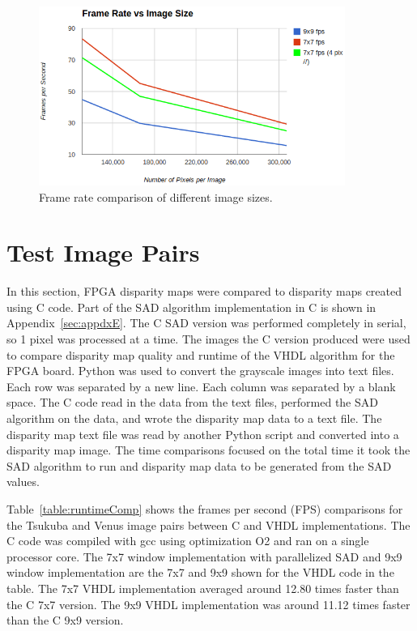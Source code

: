 \begin{figure}
	\begin{center}
		\includegraphics[width=100mm]{figures/frameRate.png}
		\captionfonts
		\caption{Frame rate comparison of different image sizes.}
		\label{fig:frameRate}
	\end{center}
\end{figure}

\section{Test Image Pairs}
\label{sec:runtime}

In this section, FPGA disparity maps were compared to disparity maps created using C code. Part of the SAD algorithm implementation in C is shown in Appendix~\ref{sec:appdxE}. The C SAD version was performed completely in serial, so 1 pixel was processed at a time. The images the C version produced were used to compare disparity map quality and runtime of the VHDL algorithm for the FPGA board. Python was used to convert the grayscale images into text files. Each row was separated by a new line. Each column was separated by a blank space. The C code read in the data from the text files, performed the SAD algorithm on the data, and wrote the disparity map data to a text file. The disparity map text file was read by another Python script and converted into a disparity map image. The time comparisons focused on the total time it took the SAD algorithm to run and disparity map data to be generated from the SAD values.

Table~\ref{table:runtimeComp} shows the frames per second (FPS) comparisons for the Tsukuba and Venus image pairs between C and VHDL implementations. The C code was compiled with gcc using optimization O2 and ran on a single processor core. The 7x7 window implementation with parallelized SAD and 9x9 window implementation are the 7x7 and 9x9 shown for the VHDL code in the table. The 7x7 VHDL implementation averaged around 12.80 times faster than the C 7x7 version. The 9x9 VHDL implementation was around 11.12 times faster than the C 9x9 version.

